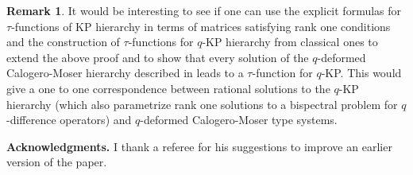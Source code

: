 \documentclass[11pt,reqno]{amsart}
\theoremstyle{definition}
\newtheorem{Remark}[Theorem]{Remark}
\numberwithin{equation}{section}
\begin{document}
\begin{Remark} It would be interesting to see if one can use the explicit 
formulas for $\tau$-functions of KP hierarchy in terms of matrices satisfying 
rank one conditions \cite{GK} and the construction of $\tau$-functions for 
$q$-KP hierarchy from classical ones to extend the above proof and to 
show that every solution of the $q$-deformed Calogero-Moser hierarchy 
described in \cite[Theorem 6.1]{I2} leads to a $\tau$-function for $q$-KP. 
This would give a one to one correspondence between rational solutions to the 
$q$-KP hierarchy (which also parametrize rank one solutions to a bispectral 
problem for $q$-difference operators) and $q$-deformed Calogero-Moser 
type systems.
\end{Remark}

\bigskip\noindent
{\bf Acknowledgments.} I thank a referee for his suggestions to
improve an earlier version of the paper.


\end{document}
